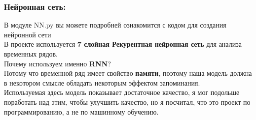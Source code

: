 \documentclass{beamer}
\begin{document}
\begin{frame}
 \frametitle{Нейронная сеть:}
 В модуле NN.py вы можете подробней ознакомится с кодом для создания нейронной сети\\
 В проекте используется \textbf{7 слойная Рекурентная нейронная сеть} для анализа временных рядов.\\
 Почему используем именно \textbf{RNN}?\\
 Потому что временной ряд имеет свойство \textbf{памяти}, поэтому наша модель должна в некотором смысле обладать некоторым эффектом запоминания.\\
 Используемая здесь модель показывает достаточное качество, я мог подольше поработать над этим, чтобы улучшить качество, но я посчитал, что это проект по программированию, а не по машинному обучению.\\
\end{frame}
\end{document}

